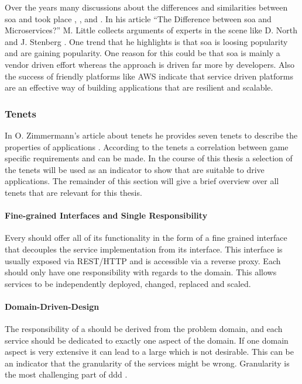 Over the years many discussions about the differences and similarities between
\gls{soa} and \mss{} took place \cite{little2017soaVSms},
\cite{ogradly2017soaVSms}, and \cite{little2015soaVSms}. In his article ``The
Difference between \gls{soa} and Microservices?'' M. Little collects arguments
of experts in the \ms{} scene like D. North \cite{north2015mss} and J. Stenberg
\cite{stenberg2014mss}. One trend that he highlights is that \gls{soa} is
loosing popularity and \mss{} are gaining popularity. One reason for this could
be that \gls{soa} is mainly a vendor driven effort whereas the \ms{} approach is
driven far more by developers. Also the success of \ms{} friendly platforms like
AWS indicate that service driven platforms are an effective way of building
applications that are resilient and scalable.

\subsubsection{\msuc{} Tenets}

In O. Zimmermann's article about \ms{} tenets he provides seven \ms{} tenets to
describe the properties of \ms{} applications
\cite{zimmermann2016microservices}. According to the tenets a correlation
between game specific requirements and \ogs{} can be made. In the course of this
thesis a selection of the \ms{} tenets will be used as an indicator to show that
\mss{} are suitable to drive \og{} applications. The remainder of this section
will give a brief overview over all \ms{} tenets that are relevant for this
thesis.

\paragraph{Fine-grained Interfaces and Single Responsibility}

Every \ms{} should offer all of its functionality in the form of a fine grained
interface that decouples the service implementation from its interface. This
interface is usually exposed via REST/HTTP and is accessible via a reverse
proxy. Each \ms{} should only have one responsibility with regards to the
domain. This allows services to be independently deployed, changed, replaced and
scaled.

\paragraph{Domain-Driven-Design}

The responsibility of a \ms{} should be derived from the problem domain, and
each service should be dedicated to exactly one aspect of the domain. If one
domain aspect is very extensive it can lead to a large \ms{} which is not
desirable. This can be an indicator that the granularity of the services might
be wrong. Granularity is the most challenging part of \gls{ddd}
\cite{millett2015patterns}.

